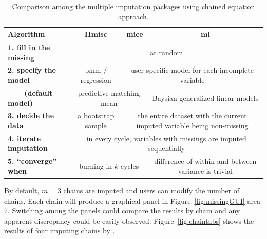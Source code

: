 \documentclass[article]{jss}
\begin{document}
\begin{center}
\begin{table}[h]
\begin{centering}
\begin{tabular}{l|c|c|c}
\hline 
\textbf{\scriptsize{Algorithm}} & \textbf{\scriptsize{Hmisc}} & \textbf{\scriptsize{mice}} & \textbf{\scriptsize{mi}}\tabularnewline
\hline 
\textbf{\scriptsize{1. fill in the missing}} & \multicolumn{3}{c}{{\scriptsize{at random}}}\tabularnewline
\hline 
\textbf{\scriptsize{2. specify the model}} & {\scriptsize{pmm / regression}} & \multicolumn{2}{c}{{\scriptsize{user-specific model for each incomplete variable}}}\tabularnewline
\hline 
\textbf{\scriptsize{~~~~(default model)}} & \multicolumn{2}{c|}{{\scriptsize{predictive matching mean}}} & {\scriptsize{Baysian generalized linear models}}\tabularnewline
\hline 
\textbf{\scriptsize{3. decide the data}} & {\scriptsize{a bootstrap sample}} & \multicolumn{2}{c}{{\scriptsize{the entire dataset with the current imputed variable being non-missing}}}\tabularnewline
\hline 
\textbf{\scriptsize{4. iterate imputation}} & \multicolumn{3}{c}{{\scriptsize{in every cycle, variables with missings are imputed sequentially}}}\tabularnewline
\hline 
\textbf{\scriptsize{5. ``converge'' when}} & \multicolumn{2}{c|}{{\scriptsize{burning-in $k$ cycles}}} & {\scriptsize{difference of within and between variance is trivial}}\tabularnewline
\hline 
\end{tabular}
\par\end{centering}
\caption{Comparison among the multiple imputation packages using chained equation approach.}
\label{tab:compare-mi}
\end{table}
\par\end{center}

By default, $m=3$ chains are imputed and users can modify the number of chains. Each chain will produce a graphical panel in Figure~\ref{fig:missingGUI} area 7. Switching among the panels could compare the results by chain and any apparent discrepancy could be easily observed. Figure~\ref{fig:chaintabs} shows the results of four imputing chains by . 
\end{document}
